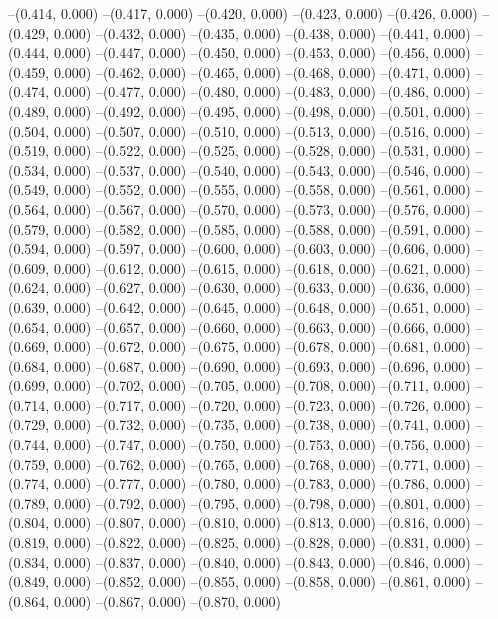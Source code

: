 --(0.414, 0.000)
--(0.417, 0.000)
--(0.420, 0.000)
--(0.423, 0.000)
--(0.426, 0.000)
--(0.429, 0.000)
--(0.432, 0.000)
--(0.435, 0.000)
--(0.438, 0.000)
--(0.441, 0.000)
--(0.444, 0.000)
--(0.447, 0.000)
--(0.450, 0.000)
--(0.453, 0.000)
--(0.456, 0.000)
--(0.459, 0.000)
--(0.462, 0.000)
--(0.465, 0.000)
--(0.468, 0.000)
--(0.471, 0.000)
--(0.474, 0.000)
--(0.477, 0.000)
--(0.480, 0.000)
--(0.483, 0.000)
--(0.486, 0.000)
--(0.489, 0.000)
--(0.492, 0.000)
--(0.495, 0.000)
--(0.498, 0.000)
--(0.501, 0.000)
--(0.504, 0.000)
--(0.507, 0.000)
--(0.510, 0.000)
--(0.513, 0.000)
--(0.516, 0.000)
--(0.519, 0.000)
--(0.522, 0.000)
--(0.525, 0.000)
--(0.528, 0.000)
--(0.531, 0.000)
--(0.534, 0.000)
--(0.537, 0.000)
--(0.540, 0.000)
--(0.543, 0.000)
--(0.546, 0.000)
--(0.549, 0.000)
--(0.552, 0.000)
--(0.555, 0.000)
--(0.558, 0.000)
--(0.561, 0.000)
--(0.564, 0.000)
--(0.567, 0.000)
--(0.570, 0.000)
--(0.573, 0.000)
--(0.576, 0.000)
--(0.579, 0.000)
--(0.582, 0.000)
--(0.585, 0.000)
--(0.588, 0.000)
--(0.591, 0.000)
--(0.594, 0.000)
--(0.597, 0.000)
--(0.600, 0.000)
--(0.603, 0.000)
--(0.606, 0.000)
--(0.609, 0.000)
--(0.612, 0.000)
--(0.615, 0.000)
--(0.618, 0.000)
--(0.621, 0.000)
--(0.624, 0.000)
--(0.627, 0.000)
--(0.630, 0.000)
--(0.633, 0.000)
--(0.636, 0.000)
--(0.639, 0.000)
--(0.642, 0.000)
--(0.645, 0.000)
--(0.648, 0.000)
--(0.651, 0.000)
--(0.654, 0.000)
--(0.657, 0.000)
--(0.660, 0.000)
--(0.663, 0.000)
--(0.666, 0.000)
--(0.669, 0.000)
--(0.672, 0.000)
--(0.675, 0.000)
--(0.678, 0.000)
--(0.681, 0.000)
--(0.684, 0.000)
--(0.687, 0.000)
--(0.690, 0.000)
--(0.693, 0.000)
--(0.696, 0.000)
--(0.699, 0.000)
--(0.702, 0.000)
--(0.705, 0.000)
--(0.708, 0.000)
--(0.711, 0.000)
--(0.714, 0.000)
--(0.717, 0.000)
--(0.720, 0.000)
--(0.723, 0.000)
--(0.726, 0.000)
--(0.729, 0.000)
--(0.732, 0.000)
--(0.735, 0.000)
--(0.738, 0.000)
--(0.741, 0.000)
--(0.744, 0.000)
--(0.747, 0.000)
--(0.750, 0.000)
--(0.753, 0.000)
--(0.756, 0.000)
--(0.759, 0.000)
--(0.762, 0.000)
--(0.765, 0.000)
--(0.768, 0.000)
--(0.771, 0.000)
--(0.774, 0.000)
--(0.777, 0.000)
--(0.780, 0.000)
--(0.783, 0.000)
--(0.786, 0.000)
--(0.789, 0.000)
--(0.792, 0.000)
--(0.795, 0.000)
--(0.798, 0.000)
--(0.801, 0.000)
--(0.804, 0.000)
--(0.807, 0.000)
--(0.810, 0.000)
--(0.813, 0.000)
--(0.816, 0.000)
--(0.819, 0.000)
--(0.822, 0.000)
--(0.825, 0.000)
--(0.828, 0.000)
--(0.831, 0.000)
--(0.834, 0.000)
--(0.837, 0.000)
--(0.840, 0.000)
--(0.843, 0.000)
--(0.846, 0.000)
--(0.849, 0.000)
--(0.852, 0.000)
--(0.855, 0.000)
--(0.858, 0.000)
--(0.861, 0.000)
--(0.864, 0.000)
--(0.867, 0.000)
--(0.870, 0.000)
